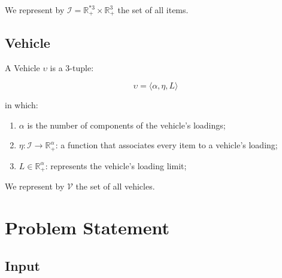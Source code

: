 \documentclass{article}
\newcommand{\realpositive}{\ensuremath{\mathbb{R}_{+}^{*}}\xspace}
\newcommand{\nrealnonnegative}[1]{\ensuremath{\mathbb{R}_{+}^{#1}}\xspace}
\newcommand{\nrealpositive}[1]{\ensuremath{\mathbb{R}_{+}^{*#1}}\xspace}
\newcommand{\tuple}[1]{#1-tuple\xspace}
\newcommand{\OrderedSet}[1]{\ensuremath{\langle#1\rangle}\xspace}
\newcommand{\function}[3]{\ensuremath{#1: #2 \rightarrow #3}\xspace}
\newcommand{\vehicleO}{\ensuremath{\upsilon}\xspace}
\newcommand{\vehicleSet}{\mathcal{V}\xspace}
\newcommand{\loadingFunction}{\ensuremath{\eta}\xspace}
\newcommand{\loadingLimit}{\ensuremath{L}\xspace}
\newcommand{\nAxles}{\ensuremath{\alpha}\xspace}
\newcommand{\loadingCodomain}{\nrealnonnegative{\nAxles}}
\newcommand{\itemSet}{\ensuremath{\mathcal{I}}\xspace}
\newcommand{\itemDomain}{\ensuremath{\nrealpositive{3} \times \nrealnonnegative{3}}\xspace}
\newcommand{\containero}{\ensuremath{c}\xspace}
\newcommand{\lx}{\ensuremath{\chi}\xspace}
\newcommand{\ly}{\ensuremath{\psi}\xspace}
\newcommand{\lz}{\ensuremath{\omega}\xspace}
\newcommand{\px}{\ensuremath{x}\xspace}
\newcommand{\py}{\ensuremath{y}\xspace}
\newcommand{\pz}{\ensuremath{z}\xspace}
\begin{document}
We represent by $\itemSet = \itemDomain$ the set of all items.

%
%
%
%

\subsection{Vehicle}

A Vehicle \vehicleO is a \tuple{3}:

\begin{equation}
	\label{def:vehicle}
	\vehicleO = \OrderedSet{
		\nAxles,
		\loadingFunction,
		\loadingLimit
	}
\end{equation}

in which:

\begin{enumerate}
	\item $\nAxles$ is the number of components of the vehicle's loadings;
	\item $\function{\loadingFunction}{\itemSet}{\loadingCodomain}$: a function that associates every item to a vehicle's loading;
	\item $\loadingLimit \in \loadingCodomain$: represents the vehicle's loading limit;
\end{enumerate}

We represent by $\vehicleSet$ the set of all vehicles.

\section{Problem Statement}

\subsection{Input}
\end{document}
